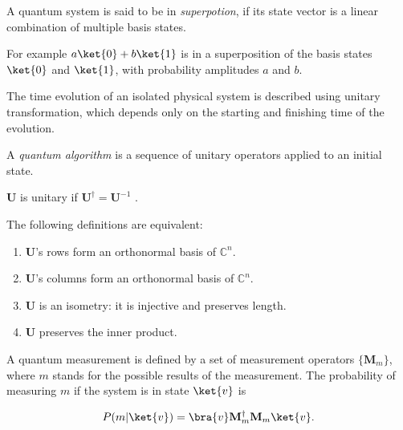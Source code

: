 \begin{definition}[Superposition]

A quantum system is said to be in \textit{superpotion}, if its state vector is a linear combination of multiple basis states.

For example $a\ket{0} + b\ket{1}$ is in a superposition of the basis states $\ket{0}$ and $\ket{1}$, with probability amplitudes $a$ and $b$.

\end{definition}

\label{PostulateII}

The time evolution of an isolated physical system is described using unitary transformation, which depends only on the starting and finishing time of the evolution.

A \textit{quantum algorithm} is a sequence of unitary operators applied to an initial state.

\begin{definition}
\label{Unitary}

$\mathbf{U}$ is unitary if $\mathbf{U}^{\dagger} = \mathbf{U}^{-1}$  \cite{HalmosLinearAlgebra}.

The following definitions are equivalent:

\begin{enumerate}
    \item $\mathbf{U}$'s rows form an orthonormal basis of $\mathds{C}^n$.
    \item $\mathbf{U}$'s columns form an orthonormal basis of $\mathds{C}^n$.
    \item $\mathbf{U}$ is an isometry: it is injective and preserves length.
    \item $\mathbf{U}$ preserves the inner product.
\end{enumerate}

\end{definition}


A quantum measurement is defined by a set of measurement operators $\{\mathbf{M}_m\}$, where $m$ stands for the possible results of the measurement. The probability of measuring $m$ if the system is in state $\ket{v}$ is

\begin{align*}
    P(m | \ket{v}) = \bra{v} \mathbf{M}_m^{\dagger} \mathbf{M}_m \ket{v}.
\end{align*}

